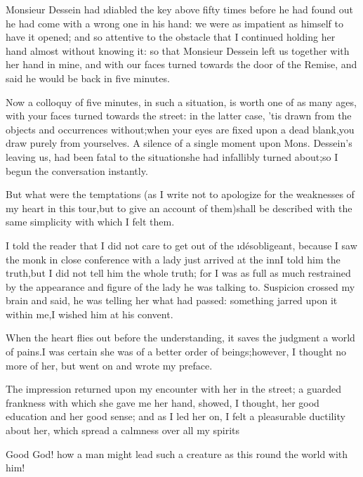 \documentclass[twoside]{article}
\begin{document}
Monsieur Dessein had \i{diabled} the key above fifty times before he had
found out he had come with a wrong one in his hand: we were as impatient
as himself to have it opened; and so attentive to the obstacle that I
continued holding her hand almost without knowing it: so that Monsieur
Dessein left us together with her hand in mine, and with our faces turned
towards the door of the Remise, and said he would be back in five
minutes.

Now a colloquy of five minutes, in such a situation, is worth one of as
many ages, with your faces turned towards the street: in the latter case,
’tis drawn from the objects and occurrences without;\tsk when your eyes are
fixed upon a dead blank,\tsk you draw purely from yourselves.  A silence of a
single moment upon Mons. Dessein’s leaving us, had been fatal to the
situation\tsk she had infallibly turned about;\tsk so I begun the conversation
instantly.\tsk 

\tsk But what were the temptations (as I write not to apologize for the
weaknesses of my heart in this tour,\tsk but to give an account of
them)\tsk shall be described with the same simplicity with which I felt them.






 I told the reader that I did not care to get out of the
\i{désobligeant}, because I saw the monk in close conference with a lady
just arrived at the inn\tsk I told him the truth,\tsk but I did not tell him the
whole truth; for I was as full as much restrained by the appearance and
figure of the lady he was talking to.  Suspicion crossed my brain and
said, he was telling her what had passed: something jarred upon it within
me,\tsk I wished him at his convent.

When the heart flies out before the understanding, it saves the judgment
a world of pains.\tsk I was certain she was of a better order of
beings;\tsk however, I thought no more of her, but went on and wrote my
preface.

The impression returned upon my encounter with her in the street; a
guarded frankness with which she gave me her hand, showed, I thought, her
good education and her good sense; and as I led her on, I felt a
pleasurable ductility about her, which spread a calmness over all my
spirits\tsk 

\tsk Good God! how a man might lead such a creature as this round the world
with him!\tsk 
\end{document}
